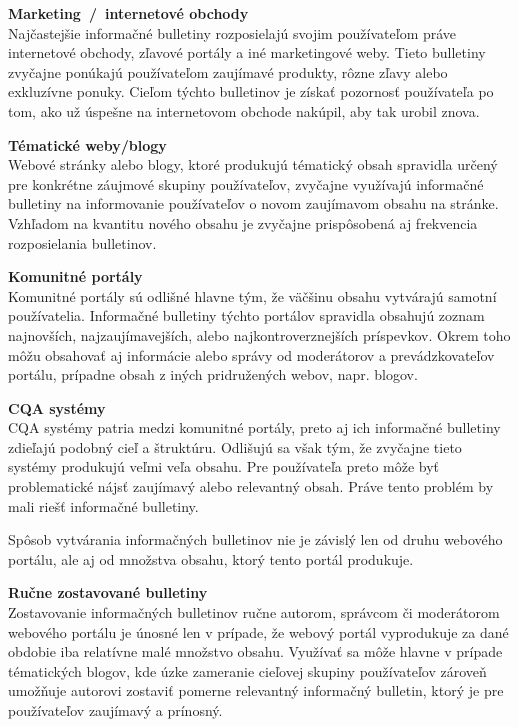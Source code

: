\begin{my_itemize}
  \item{\textbf{Marketing~/~internetové obchody}\\
        Najčastejšie informačné bulletiny rozposielajú svojim používateľom
        práve internetové obchody, zľavové portály a iné marketingové weby. Tieto bulletiny zvyčajne ponúkajú používateľom
        zaujímavé produkty, rôzne zľavy alebo exkluzívne ponuky. Cieľom týchto bulletinov je získať pozornosť používateľa
        po tom, ako už úspešne na internetovom obchode nakúpil, aby tak urobil znova.}
  \item{\textbf{Tématické weby/blogy}\\
        Webové stránky alebo blogy, ktoré produkujú tématický obsah spravidla určený pre konkrétne záujmové skupiny používateľov,
        zvyčajne využívajú informačné bulletiny na informovanie používateľov o novom zaujímavom obsahu na stránke.
        Vzhľadom na kvantitu nového obsahu je zvyčajne prispôsobená aj frekvencia rozposielania bulletinov.}
  \item{\textbf{Komunitné portály}\\
        Komunitné portály sú odlišné hlavne tým, že väčšinu obsahu vytvárajú samotní používatelia. Informačné
        bulletiny týchto portálov spravidla obsahujú zoznam najnovších, najzaujímavejších, alebo najkontroverznejších
        príspevkov. Okrem toho môžu obsahovať aj informácie alebo správy od moderátorov a prevádzkovateľov portálu, prípadne
        obsah z iných pridružených webov, napr. blogov.}
  \item{\textbf{CQA systémy}\\
        CQA systémy patria medzi komunitné portály, preto aj ich informačné bulletiny zdieľajú podobný cieľ a štruktúru.
        Odlišujú sa však tým, že zvyčajne tieto systémy produkujú veľmi veľa obsahu. Pre používateľa preto môže byť
        problematické nájsť zaujímavý alebo relevantný obsah. Práve tento problém by mali riešť informačné bulletiny.}
\end{my_itemize}


Spôsob vytvárania informačných bulletinov nie je závislý len od druhu webového portálu, ale aj od množstva obsahu, ktorý
tento portál produkuje.

\textbf{Ručne zostavované bulletiny}\\
Zostavovanie informačných bulletinov ručne autorom, správcom či moderátorom webového portálu je únosné len v prípade, že
webový portál vyprodukuje za dané obdobie iba relatívne malé množstvo obsahu. Využívať sa môže hlavne v prípade tématických
blogov, kde úzke zameranie cieľovej skupiny používateľov zároveň umožňuje autorovi zostaviť pomerne relevantný informačný
bulletin, ktorý je pre používateľov zaujímavý a prínosný.

